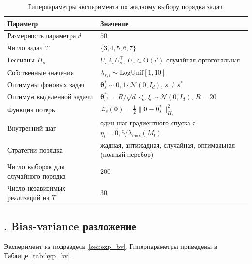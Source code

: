 \documentclass[a4paper,14pt,oneside,openany]{extarticle}
\newcommand{\cL}{\mathcal{L}}
\newcommand{\cN}{\mathcal{N}}
\newcommand{\btheta}{\boldsymbol{\theta}}
\begin{document}
\begin{table}[h!]
\centering
\small
\caption{Гиперпараметры эксперимента по жадному выбору порядка задач.}
\label{tab:hyp_greedy}
\begin{tabularx}{\linewidth}{lX}
\toprule
Параметр & Значение \\
\midrule
Размерность параметра $d$ & $50$ \\
Число задач $T$ & $\{3, 4, 5, 6, 7\}$ \\
Гессианы $H_s$ & $U_s \Lambda_s U_s^\top$, $U_s \in \mathrm{O}(d)$ случайная ортогональная \\
Собственные значения & $\lambda_{s,i} \sim \mathrm{LogUnif}[1, 10]$ \\
Оптимумы фоновых задач & $\btheta^*_s \sim 0{,}1\cdot\cN(0, I_d)$, $s \ne s^*$ \\
Оптимум выделенной задачи & $\btheta^*_{s^*} = R/\sqrt{d}\cdot\xi$, $\xi \sim \cN(0, I_d)$, $R = 20$ \\
Функция потерь & $\cL_s(\btheta) = \tfrac{1}{2}\|\btheta - \btheta^*_s\|^2_{H_s}$ \\
Внутренний шаг & один шаг градиентного спуска с $\eta_t = 0{,}5/\lambda_{\max}(M_t)$ \\
Стратегии порядка & жадная, антижадная, случайная, оптимальная (полный перебор) \\
Число выборок для случайного порядка & $200$ \\
Число независимых реализаций на $T$ & $30$ \\
\bottomrule
\end{tabularx}
\end{table}
\newpage
{}
\subsection*{\theappthm. Bias-variance разложение}\label{app:hyp_bv}

Эксперимент из подраздела~\ref{sec:exp_bv}. Гиперпараметры приведены в Таблице~\ref{tab:hyp_bv}.
\end{document}
